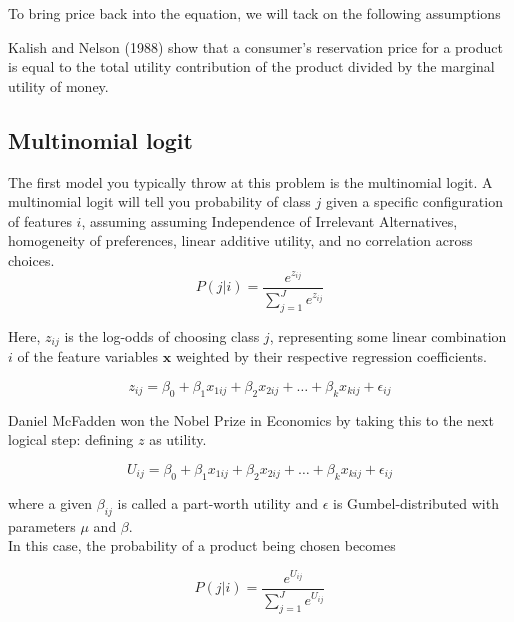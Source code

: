 \documentclass{article}
\begin{document}
To bring price back into the equation, we will tack on the following assumptions

Kalish and Nelson (1988) show that a consumer's reservation price for a product is equal to the total utility contribution of the product divided by the marginal utility of money.
  





\subsection{Multinomial logit}

The first model you typically throw at this problem is the multinomial logit. A multinomial logit will tell you probability of class $j$ given a specific configuration of features $i$, assuming assuming Independence of Irrelevant Alternatives, homogeneity of preferences, linear additive utility, and no correlation across choices. \\

\[
P(j|i) = \frac{e^{z_{ij}}}{\sum_{j=1}^{J} e^{z_{ij}}}
\]

Here, $z_{ij}$ is the log-odds of choosing class $j$, representing some linear combination $i$ of the feature variables $$ weighted by their respective regression coefficients. 

\[
z_{ij} = \beta_0 + \beta_1 x_{1ij} + \beta_2 x_{2ij} + \ldots + \beta_k x_{kij} + \epsilon_{ij}
\]

Daniel McFadden won the Nobel Prize in Economics by taking this to the next logical step: defining $z$ as utility.

\[
U_{ij} = \beta_0 + \beta_1 x_{1ij} + \beta_2 x_{2ij} + \ldots + \beta_k x_{kij} + \epsilon_{ij}
\]


where a given $\beta_{ij}$ is called a part-worth utility and $\epsilon$ is Gumbel-distributed with parameters $\mu$ and $\beta$. \\

In this case, the probability of a product being chosen becomes

\[
P(j|i) = \frac{e^{U_{ij}}}{\sum_{j=1}^{J} e^{U_{ij}}}
\]
\end{document}
